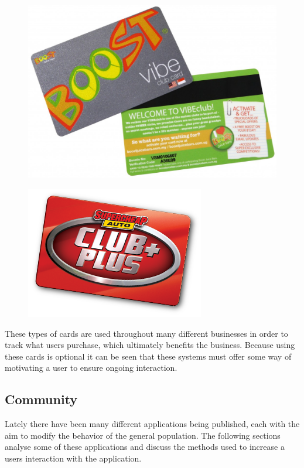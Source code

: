 \documentclass[a4paper,12pt]{article}
\begin{document}
\begin{figure}[!ht]
	\centering
	\begin{minipage}{.5\textwidth}
	  \centering
	  \includegraphics[width=.6\linewidth]{./images/clubCard-boost}
	  \label{clubCard-boost}
	\end{minipage}%
	\begin{minipage}{.5\textwidth}
	  \centering
	  \includegraphics[width=.6\linewidth]{./images/clubCard-sca}
	  \label{clubCard-sca}
	\end{minipage}
\end{figure}

\par
These types of cards are used throughout many different businesses in order to track what users purchase, which ultimately benefits the business. Because using these cards is optional it can be seen that these systems must offer some way of motivating a user to ensure ongoing interaction.

\subsection{Community}
Lately there have been many different applications being published, each with the aim to modify the behavior of the general population. The following sections analyse some of these applications and discuss the methods used to increase a users interaction with the application.
\end{document}
